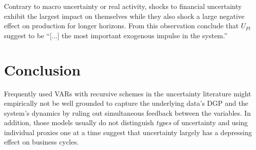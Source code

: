 \documentclass[a4paper,11pt,listof=nochaptergap,oneside,pointednumbers,bibtotoc,bigheadings,liststotoc,hidelinks]{scrbook}
\theoremstyle{mysatz}
\theoremstyle{mydefinition}
\theoremstyle{mytheorem}
\theoremstyle{mybemerkung}
\renewcommand*{\paragraph}[1]{\subsubsection*{#1} \vspace{-3mm}} %
\begin{document}
Contrary to macro uncertainty or real activity, shocks to financial uncertainty exhibit the largest impact on themselves while they also shock a large negative effect on production for longer horizons. From this observation \citet[p. 28]{ludvigsonetal:19} conclude that $U_{Ft}$ suggest to be ``[...] the most important exogenous impulse in the system.''











\chapter{Conclusion}
\label{Conclusion}
Frequently used VARs with recursive schemes in the uncertainty literature might empirically not be well grounded to capture the underlying data's DGP and the system's dynamics by ruling out simultaneous feedback between the variables. In addition, those models usually do not distinguish \textit{types} of uncertainty and using individual proxies one at a time suggest that uncertainty largely has a depressing effect on business cycles.
\end{document}
